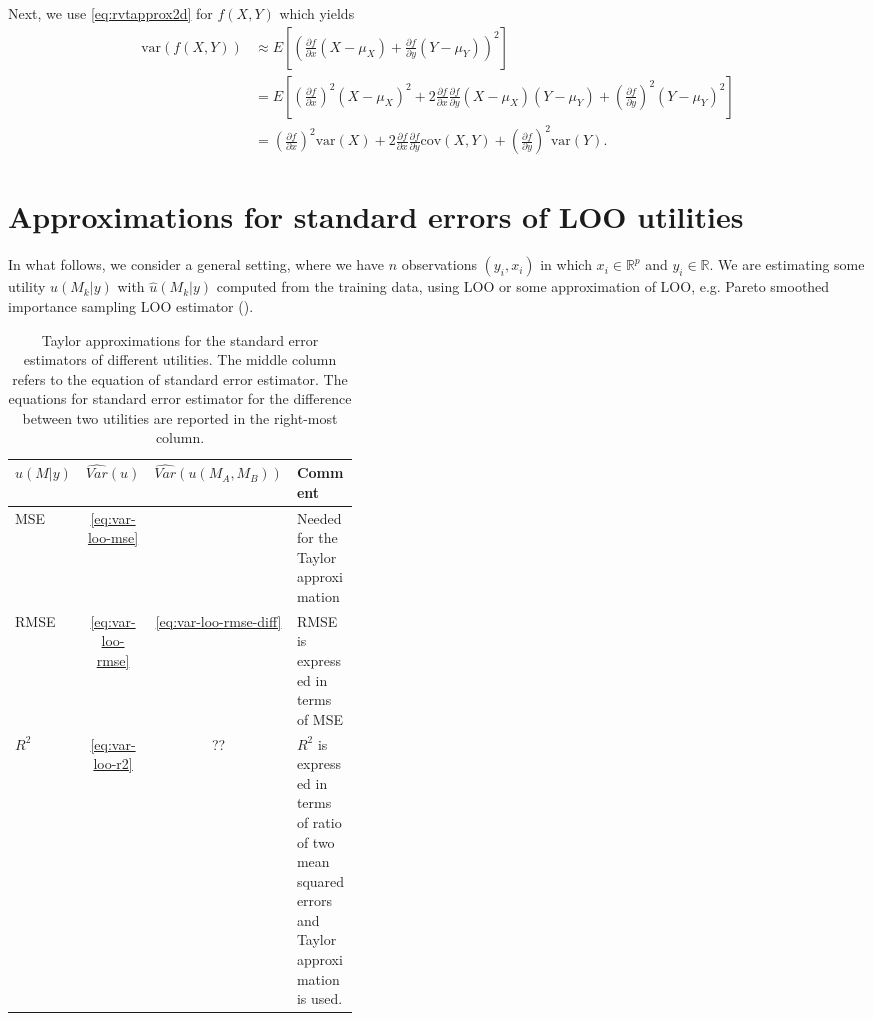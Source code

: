 \documentclass{article}
\begin{document}
Next, we use \eqref{eq:rvtapprox2d} for $f(X,Y)$ which yields
\begin{align}
    \text{var}(f(X, Y)) &\approx E\left[ \left( \frac{\partial f}{\partial x} (X - \mu_X) + \frac{\partial f}{\partial y} (Y - \mu_Y) \right)^2 \right] \nonumber \\
    &= E\left[ \left( \frac{\partial f}{\partial x}  \right)^2 (X - \mu_X)^2 + 2 \frac{\partial f}{\partial x} \frac{\partial f}{\partial y} (X - \mu_X)(Y - \mu_Y) + \left( \frac{\partial f}{\partial y}  \right)^2 (Y - \mu_Y)^2  \right] \nonumber \\
    &= \left( \frac{\partial f}{\partial x}  \right)^2 \text{var}(X) + 2 \frac{\partial f}{\partial x} \frac{\partial f}{\partial y} \text{cov}(X, Y) + \left( \frac{\partial f}{\partial y}  \right)^2 \text{var}(Y). \label{eq:varapprox2d}
\end{align}

\section{Approximations for standard errors of LOO utilities}
In what follows, we consider a general setting, where we have $n$ observations $(y_i, x_i)$ in which $x_i \in \mathbb{R}^p$ and $y_i \in \mathbb{R}$. We are estimating some utility $u(M_k | y)$ with $\hat{u}(M_k |y)$ computed from the training data, using LOO or some approximation of LOO, e.g. Pareto smoothed importance sampling LOO estimator (\cite{vehtari_practical_2016}).

\begin{table}[!htb]
    \centering
    \begin{tabular}{l c c p{0.4\linewidth}}
    \toprule
    $u(M | y)$ & $\widehat{Var}(u)$  & $\widehat{Var}(u(M_A, M_B))$ & Comment \\ \midrule
    MSE & \eqref{eq:var-loo-mse} &  & Needed for the Taylor approximation\\
    RMSE  & \eqref{eq:var-loo-rmse} & \eqref{eq:var-loo-rmse-diff} & RMSE is expressed in terms of MSE\\
    $R^2$ & \eqref{eq:var-loo-r2} & ?? & $R^2$ is expressed in terms of ratio of two mean squared errors and Taylor approximation is used.
    \end{tabular}
    \caption{Taylor approximations for the standard error estimators of different utilities. The middle column refers to the equation of standard error estimator. The equations for standard error estimator for the difference between two utilities are reported in the right-most column.}
    \label{tbl:se-approximations}
\end{table}
\end{document}
